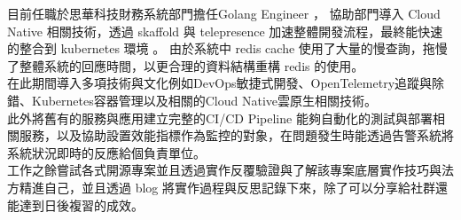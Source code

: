 %
%
\par{
目前任職於思華科技財務系統部門擔任Golang Engineer ， 協助部門導入 Cloud  Native 相關技術，透過 skaffold 與 telepresence 加速整體開發流程，最終能快速的整合到  kubernetes 環境 。
由於系統中 redis cache 使用了大量的慢查詢，拖慢了整體系統的回應時間，以更合理的資料結構重構 redis 的使用。\\
在此期間導入多項技術與文化例如DevOps敏捷式開發、OpenTelemetry追蹤與除錯、Kubernetes容器管理以及相關的Cloud Native雲原生相關技術。\\
此外將舊有的服務與應用建立完整的CI/CD Pipeline 能夠自動化的測試與部署相關服務，以及協助設置效能指標作為監控的對象，在問題發生時能透過告警系統將系統狀況即時的反應給個負責單位。\\
工作之餘嘗試各式開源專案並且透過實作反覆驗證與了解該專案底層實作技巧與法方精進自己，並且透過 blog 將實作過程與反思記錄下來，除了可以分享給社群還能達到日後複習的成效。
}